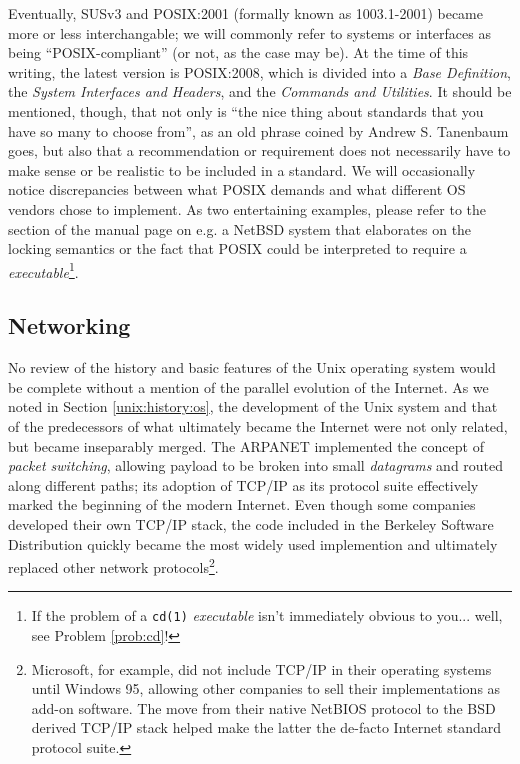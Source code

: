 Eventually, SUSv3 and POSIX:2001 (formally known as
 1003.1-2001)
became more or less interchangable; we will commonly
refer to systems or interfaces as being
``POSIX-compliant'' (or not, as the case may be).  At
the time of this writing, the latest version is
POSIX:2008\cite{history:posix2008}, which is divided
into a {\em Base Definition}, the {\em System
Interfaces and Headers}, and the {\em Commands and
Utilities}.  It should be mentioned, though, that
not only is ``the nice thing about standards that you
have so many to choose
from''\cite{history:tanenbaum-standards}, as an old
phrase coined by Andrew S.
Tanenbaum goes,
but also that a recommendation or requirement does not
necessarily have to make sense or be realistic to be
included in a standard.  We will occasionally notice
discrepancies between what POSIX demands and what
different OS vendors chose to implement.  As two
entertaining examples, please refer to the section of
the  manual page on e.g. a NetBSD
system\cite{history:fcntl} that elaborates on the
locking semantics or the fact that POSIX could be
interpreted to require a  {\em
executable}\footnote{If the problem of a {\tt cd(1)}
{\em executable} isn't immediately obvious to you...
well, see Problem \ref{prob:cd}!}.

\subsection{Networking}
\label{unix:networking}

No review of the history and basic features of the
Unix operating system would be complete without a
mention of the parallel evolution of the Internet.  As
we noted in Section \ref{unix:history:os}, the
development of the Unix system and that of the
predecessors of what ultimately became the Internet
were not only related, but became inseparably merged.
The ARPANET implemented the concept of
{\em packet switching},
allowing payload to be broken into small {\em
datagrams} and routed along different paths; its
adoption of TCP/IP\cite{history:cerf-kahn:tcp} as its
protocol suite effectively marked the beginning of the
modern Internet.  Even though some companies developed
their own TCP/IP stack, the code included in the
Berkeley Software Distribution quickly became the most
widely used implemention and ultimately replaced other
network protocols\footnote{Microsoft, for example, did
not include TCP/IP in their operating systems until
Windows 95, allowing other companies to sell their
implementations as add-on software.  The move from
their native  NetBIOS protocol to the
BSD derived TCP/IP stack helped make the latter the
de-facto Internet standard protocol suite.}.

